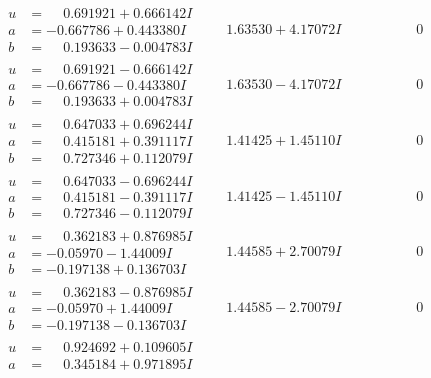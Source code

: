 \documentclass[1p]{elsarticle_modified}
\theoremstyle{definition}
\begin{document}
$$\begin{array}{c|c|c}
\begin{aligned}
u &= \phantom{-}0.691921 + 0.666142 I \\
a &= -0.667786 + 0.443380 I \\
b &= \phantom{-}0.193633 - 0.004783 I\end{aligned}
 & \phantom{-}1.63530 + 4.17072 I & \phantom{-0.000000 } 0 \\ \hline\begin{aligned}
u &= \phantom{-}0.691921 - 0.666142 I \\
a &= -0.667786 - 0.443380 I \\
b &= \phantom{-}0.193633 + 0.004783 I\end{aligned}
 & \phantom{-}1.63530 - 4.17072 I & \phantom{-0.000000 } 0 \\ \hline\begin{aligned}
u &= \phantom{-}0.647033 + 0.696244 I \\
a &= \phantom{-}0.415181 + 0.391117 I \\
b &= \phantom{-}0.727346 + 0.112079 I\end{aligned}
 & \phantom{-}1.41425 + 1.45110 I & \phantom{-0.000000 } 0 \\ \hline\begin{aligned}
u &= \phantom{-}0.647033 - 0.696244 I \\
a &= \phantom{-}0.415181 - 0.391117 I \\
b &= \phantom{-}0.727346 - 0.112079 I\end{aligned}
 & \phantom{-}1.41425 - 1.45110 I & \phantom{-0.000000 } 0 \\ \hline\begin{aligned}
u &= \phantom{-}0.362183 + 0.876985 I \\
a &= -0.05970 - 1.44009 I \\
b &= -0.197138 + 0.136703 I\end{aligned}
 & \phantom{-}1.44585 + 2.70079 I & \phantom{-0.000000 } 0 \\ \hline\begin{aligned}
u &= \phantom{-}0.362183 - 0.876985 I \\
a &= -0.05970 + 1.44009 I \\
b &= -0.197138 - 0.136703 I\end{aligned}
 & \phantom{-}1.44585 - 2.70079 I & \phantom{-0.000000 } 0 \\ \hline\begin{aligned}
u &= \phantom{-}0.924692 + 0.109605 I \\
a &= \phantom{-}0.345184 + 0.971895 I \\

\end{aligned}
\end{array}$$
\end{document}
